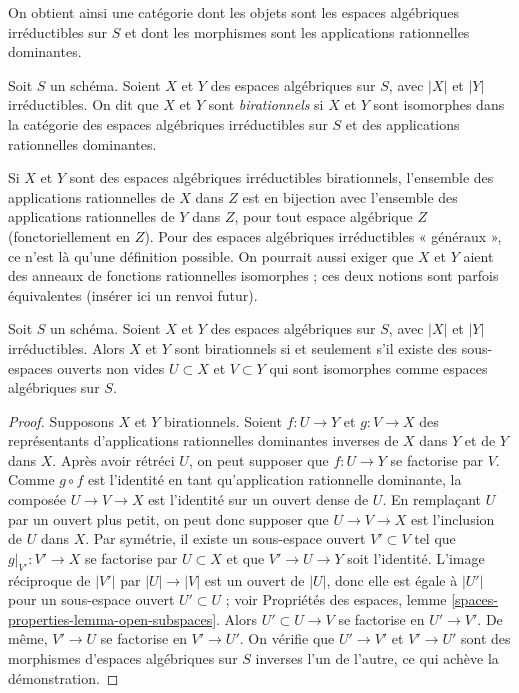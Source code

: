 \medskip\noindent
On obtient ainsi une catégorie dont les objets sont les espaces algébriques
irréductibles sur $S$ et dont les morphismes sont les applications rationnelles dominantes.

\begin{definition}
\label{definition-birational-spaces}
Soit $S$ un schéma. Soient $X$ et $Y$ des espaces algébriques
sur $S$, avec $|X|$ et $|Y|$ irréductibles.
On dit que $X$ et $Y$ sont {\it birationnels} si $X$ et $Y$ sont isomorphes
dans la catégorie des espaces algébriques irréductibles sur $S$
et des applications rationnelles dominantes.
\end{definition}

\noindent
Si $X$ et $Y$ sont des espaces algébriques irréductibles birationnels,
l'ensemble des applications rationnelles de $X$ dans $Z$ est en bijection
avec l'ensemble des applications rationnelles de $Y$ dans $Z$, pour tout espace
algébrique $Z$ (fonctoriellement en $Z$). Pour des espaces algébriques irréductibles « généraux »,
ce n'est là qu'une définition possible. On pourrait aussi
exiger que $X$ et $Y$ aient des anneaux de fonctions
rationnelles isomorphes ; ces deux notions sont parfois équivalentes
(insérer ici un renvoi futur).

\begin{lemma}
\label{lemma-birational}
Soit $S$ un schéma. Soient $X$ et $Y$ des espaces
algébriques sur $S$, avec $|X|$ et $|Y|$ irréductibles.
Alors $X$ et $Y$ sont birationnels si et seulement s'il existe
des sous-espaces ouverts non vides $U \subset X$ et $V \subset Y$
qui sont isomorphes comme espaces algébriques sur $S$.
\end{lemma}

\begin{proof}
Supposons $X$ et $Y$ birationnels. Soient $f : U \to Y$ et $g : V \to X$
des représentants d'applications rationnelles dominantes inverses de $X$ dans $Y$ et de $Y$ dans $X$.
Après avoir rétréci $U$, on peut supposer que $f : U \to Y$ se factorise par $V$.
Comme $g \circ f$ est l'identité en tant qu'application rationnelle dominante,
la composée $U \to V \to X$ est l'identité sur un ouvert dense de $U$.
En remplaçant $U$ par un ouvert plus petit, on peut donc supposer que
$U \to V \to X$ est l'inclusion de $U$ dans $X$.
Par symétrie, il existe un sous-espace ouvert $V' \subset V$
tel que $g|_{V'} : V' \to X$ se factorise par $U \subset X$
et que $V' \to U \to Y$ soit l'identité.
L'image réciproque de $|V'|$ par $|U| \to |V|$ est un ouvert de $|U|$,
donc elle est égale à $|U'|$ pour un sous-espace ouvert $U' \subset U$ ; voir
Propriétés des espaces, lemme \ref{spaces-properties-lemma-open-subspaces}.
Alors $U' \subset U \to V$ se factorise en $U' \to V'$.
De même, $V' \to U$ se factorise en $V' \to U'$.
On vérifie que $U' \to V'$
et $V' \to U'$ sont des morphismes
d'espaces algébriques sur $S$ inverses l'un de l'autre,
ce qui achève la démonstration.
\end{proof}









